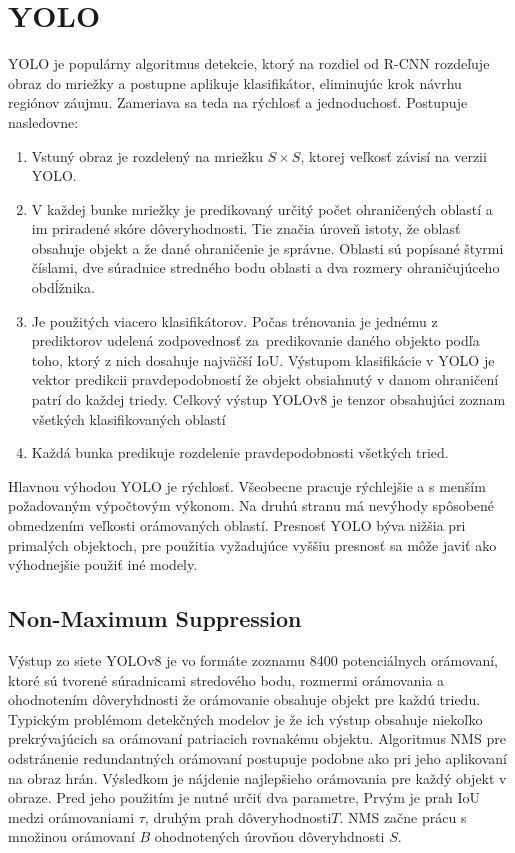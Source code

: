     \section{YOLO}
        \ac{YOLO} je populárny algoritmus detekcie, ktorý na rozdiel od \ac{R-CNN} rozdeľuje obraz do mriežky a postupne aplikuje klasifikátor, eliminujúc krok návrhu regiónov záujmu. Zameriava sa teda na rýchlosť a jednoduchosť. Postupuje nasledovne:

        \begin{enumerate}
            \item Vstuný obraz je rozdelený na mriežku $S \times S$, ktorej veľkosť závisí na verzii \ac{YOLO}.
            \item V každej bunke mriežky je predikovaný určitý počet ohraničených oblastí a im priradené skóre dôveryhodnosti. Tie značia úroveň istoty, že oblasť obsahuje objekt a že dané ohraničenie je správne. Oblasti sú popísané štyrmi číslami, dve súradnice stredného bodu oblasti a dva rozmery ohraničujúceho obdĺžnika.
            \item Je použitých viacero klasifikátorov. Počas trénovania je jednému z prediktorov udelená zodpovednosť za~predikovanie daného objekto podľa toho, ktorý z nich dosahuje najväčší \ac{IoU}. Výstupom klasifikácie v \ac{YOLO} je vektor predikcii pravdepodobností že objekt obsiahnutý v danom ohraničení patrí do každej triedy. Celkový výstup YOLOv8 je tenzor obsahujúci zoznam všetkých klasifikovaných oblastí
            \item Každá bunka predikuje rozdelenie pravdepodobnosti všetkých tried.
        \end{enumerate}

        Hlavnou výhodou \ac{YOLO} je rýchlosť. Všeobecne pracuje rýchlejšie a s menším požadovaným výpočtovým výkonom. Na druhú stranu má nevýhody spôsobené obmedzením veľkosti orámovaných oblastí. Presnosť \ac{YOLO} býva nižšia pri primalých objektoch, pre použitia vyžadujúce vyššiu presnosť sa môže javiť ako výhodnejšie použiť iné modely.

        \subsection{Non-Maximum Suppression}
            Výstup zo siete YOLOv8 je vo formáte zoznamu 8400 potenciálnych orámovaní, ktoré sú tvorené súradnicami stredového bodu, rozmermi orámovania a ohodnotením dôveryhdnosti že orámovanie obsahuje objekt pre každú triedu. Typickým problémom detekčných modelov je že ich výstup obsahuje niekoľko prekrývajúcich sa orámovaní patriacich rovnakému objektu. Algoritmus \ac{NMS} pre odstránenie redundantných orámovaní postupuje podobne ako pri jeho aplikovaní na obraz hrán. Výsledkom je nájdenie najlepšieho orámovania pre každý objekt v obraze. Pred jeho použitím je nutné určiť dva parametre, Prvým je prah \ac{IoU} medzi orámovaniami $\tau$, druhým prah dôveryhodnosti$T$. \ac{NMS} začne prácu s množinou orámovaní $B$ ohodnotených úrovňou dôveryhdnosti $S$.

